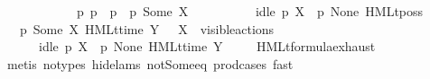 \begin{isabellebody}
\ \ \ \ \ \ \ {\isacharparenleft}{\kern0pt}{\isacharparenleft}{\kern0pt}{\isasymalpha}\ {\isacharequal}{\kern0pt}\ {\isasymtau}{\isacharparenright}{\kern0pt}\ {\isasymand}\ {\isacharparenleft}{\kern0pt}{\isasymexists}\ p{\isacharprime}{\kern0pt}{\isachardot}{\kern0pt}\ p\ {\isasymlongmapsto}{\isasymtau}\ p{\isacharprime}{\kern0pt}\ {\isasymand}\ p{\isacharprime}{\kern0pt}\ {\isasymTTurnstile}{\isacharquery}{\kern0pt}{\isacharbrackleft}{\kern0pt}Some\ X{\isacharbrackright}{\kern0pt}\ {\isasymphi}{\isacharparenright}{\kern0pt}{\isacharparenright}{\kern0pt}\ {\isasymor}\ \isanewline
\ \ \ \ \ \ \ {\isacharparenleft}{\kern0pt}{\isacharparenleft}{\kern0pt}idle\ p\ X{\isacharparenright}{\kern0pt}\ {\isasymand}\ {\isacharparenleft}{\kern0pt}p\ {\isasymTTurnstile}{\isacharquery}{\kern0pt}{\isacharbrackleft}{\kern0pt}None{\isacharbrackright}{\kern0pt}\ {\isacharparenleft}{\kern0pt}HMLt{\isacharunderscore}{\kern0pt}poss\ {\isasymalpha}\ {\isasymphi}{\isacharparenright}{\kern0pt}{\isacharparenright}{\kern0pt}{\isacharparenright}{\kern0pt}{\isacharparenright}{\kern0pt}{\isacharparenright}{\kern0pt}{\isacartoucheclose}\ \isanewline
\ \ {\isacharbar}{\kern0pt}\ {\isacartoucheopen}{\isacharparenleft}{\kern0pt}p\ {\isasymTTurnstile}{\isacharquery}{\kern0pt}{\isacharbrackleft}{\kern0pt}Some\ X{\isacharbrackright}{\kern0pt}\ {\isacharparenleft}{\kern0pt}HMLt{\isacharunderscore}{\kern0pt}time\ Y\ {\isasymphi}{\isacharparenright}{\kern0pt}{\isacharparenright}{\kern0pt}\ {\isacharequal}{\kern0pt}\ {\isacharparenleft}{\kern0pt}X\ {\isasymsubseteq}\ visible{\isacharunderscore}{\kern0pt}actions\ {\isasymand}\isanewline
\ \ \ \ \ \ {\isacharparenleft}{\kern0pt}{\isacharparenleft}{\kern0pt}idle\ p\ X{\isacharparenright}{\kern0pt}\ {\isasymand}\ {\isacharparenleft}{\kern0pt}p\ {\isasymTTurnstile}{\isacharquery}{\kern0pt}{\isacharbrackleft}{\kern0pt}None{\isacharbrackright}{\kern0pt}\ {\isacharparenleft}{\kern0pt}HMLt{\isacharunderscore}{\kern0pt}time\ Y\ {\isasymphi}{\isacharparenright}{\kern0pt}{\isacharparenright}{\kern0pt}{\isacharparenright}{\kern0pt}{\isacharparenright}{\kern0pt}{\isacartoucheclose}\isanewline
%
\isadelimproof
\ \ %
\endisadelimproof
%
\isatagproof
{}\isamarkupfalse%
\ HMLt{\isacharunderscore}{\kern0pt}formula{\isachardot}{\kern0pt}exhaust\isanewline
\ \ \isamarkupfalse%
\ {\isacharparenleft}{\kern0pt}metis\ {\isacharparenleft}{\kern0pt}no{\isacharunderscore}{\kern0pt}types{\isacharcomma}{\kern0pt}\ hide{\isacharunderscore}{\kern0pt}lams{\isacharparenright}{\kern0pt}\ not{\isacharunderscore}{\kern0pt}Some{\isacharunderscore}{\kern0pt}eq\ prod{\isacharunderscore}{\kern0pt}cases{}{\isacharcomma}{\kern0pt}\ fast{\isacharplus}{\kern0pt}{\isacharparenright}{\kern0pt}%

\end{isabellebody}
